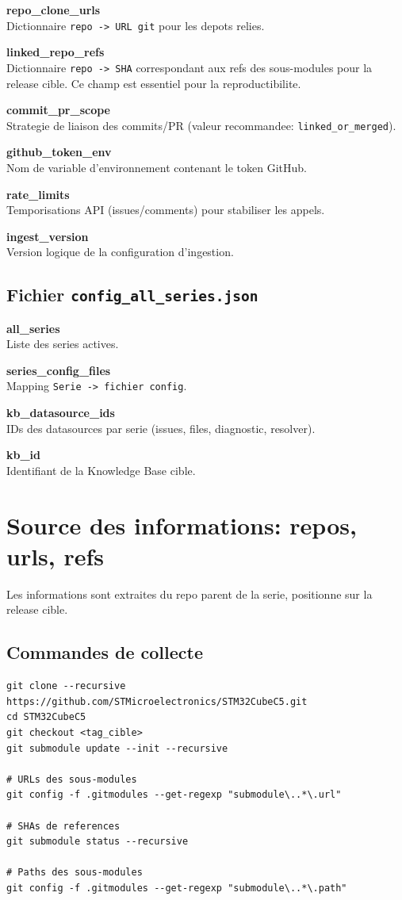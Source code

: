 \documentclass[11pt,a4paper]{article}
\begin{document}
\textbf{repo\_clone\_urls}\\
Dictionnaire \texttt{repo -> URL git} pour les depots relies.

\textbf{linked\_repo\_refs}\\
Dictionnaire \texttt{repo -> SHA} correspondant aux refs des sous-modules pour la
release cible. Ce champ est essentiel pour la reproductibilite.

\textbf{commit\_pr\_scope}\\
Strategie de liaison des commits/PR (valeur recommandee: \texttt{linked\_or\_merged}).

\textbf{github\_token\_env}\\
Nom de variable d'environnement contenant le token GitHub.

\textbf{rate\_limits}\\
Temporisations API (issues/comments) pour stabiliser les appels.

\textbf{ingest\_version}\\
Version logique de la configuration d'ingestion.

\subsection{Fichier \texttt{config\_all\_series.json}}
\textbf{all\_series}\\
Liste des series actives.

\textbf{series\_config\_files}\\
Mapping \texttt{Serie -> fichier config}.

\textbf{kb\_datasource\_ids}\\
IDs des datasources par serie (issues, files, diagnostic, resolver).

\textbf{kb\_id}\\
Identifiant de la Knowledge Base cible.

\section{Source des informations: repos, urls, refs}
Les informations sont extraites du repo parent de la serie, positionne sur la
release cible.

\subsection{Commandes de collecte}
\label{sec:commandes-collecte}
\begin{lstlisting}[style=cmd]
git clone --recursive https://github.com/STMicroelectronics/STM32CubeC5.git
cd STM32CubeC5
git checkout <tag_cible>
git submodule update --init --recursive

# URLs des sous-modules
git config -f .gitmodules --get-regexp "submodule\..*\.url"

# SHAs de references
git submodule status --recursive

# Paths des sous-modules
git config -f .gitmodules --get-regexp "submodule\..*\.path"
\end{lstlisting}
\end{document}
